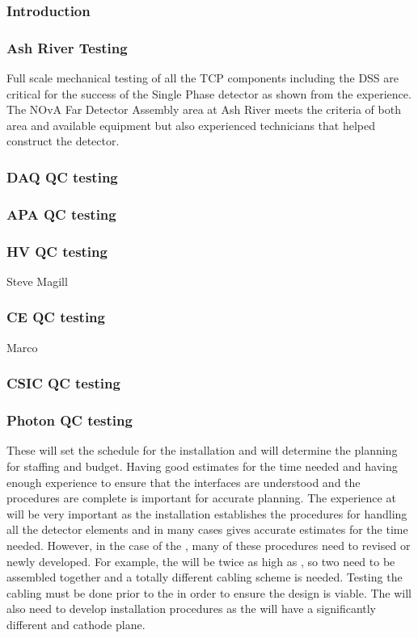 \subsubsection{Introduction}

\subsubsection{Ash River Testing}

Full scale mechanical testing of all the TCP components including the DSS are critical for the success of the Single Phase detector as shown from the  experience. The NOvA Far Detector Assembly area at Ash River meets the criteria of both area and available equipment but also experienced technicians that helped construct the  detector.  

\subsubsection{DAQ QC testing}

\subsubsection{APA QC testing}

\subsubsection{HV QC testing}
Steve Magill
\subsubsection{CE QC testing}
Marco
\subsubsection{CSIC QC testing}

\subsubsection{Photon QC testing}

These will set the schedule for the installation and will
determine the planning for staffing and budget. Having good estimates
for the time needed and having enough experience to ensure that the
interfaces are understood and the procedures are complete is important
for accurate planning. The experience at  will be
very important as the  installation establishes the
procedures for handling all the detector elements and in many cases
gives accurate estimates for the time needed. However, in the case of
the , many of these procedures need to revised or
newly developed. For example, the  will be twice as high as
, so two  need to be assembled together
and a totally different cabling scheme is needed. Testing the
cabling must be done prior to the  
in order to
ensure the design is viable. The  will also need to develop
installation procedures as the  
will have a significantly different  and cathode plane. 

